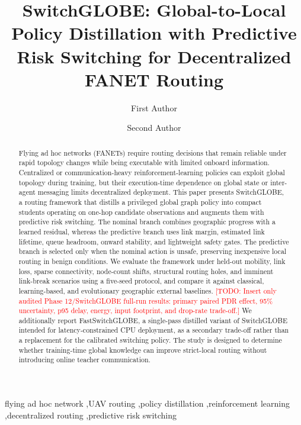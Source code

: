 \documentclass[preprint,12pt]{elsarticle}
\newcommand{\method}{SwitchGLOBE}
\newcommand{\fastmethod}{FastSwitchGLOBE}
\newcommand{\todo}[1]{\textcolor{red}{[TODO: #1]}}
\begin{document}
\begin{frontmatter}

\title{SwitchGLOBE: Global-to-Local Policy Distillation with Predictive Risk Switching for Decentralized FANET Routing}

\author[aff1]{First Author}
\author[aff1]{Second Author}
\address[aff1]{Department, Institution, City, Postal Code, Republic of Korea}

\begin{abstract}
Flying ad hoc networks (FANETs) require routing decisions that remain reliable under rapid topology changes while being executable with limited onboard information. Centralized or communication-heavy reinforcement-learning policies can exploit global topology during training, but their execution-time dependence on global state or inter-agent messaging limits decentralized deployment. This paper presents \method, a routing framework that distills a privileged global graph policy into compact students operating on one-hop candidate observations and augments them with predictive risk switching. The nominal branch combines geographic progress with a learned residual, whereas the predictive branch uses link margin, estimated link lifetime, queue headroom, onward stability, and lightweight safety gates. The predictive branch is selected only when the nominal action is unsafe, preserving inexpensive local routing in benign conditions. We evaluate the framework under held-out mobility, link loss, sparse connectivity, node-count shifts, structural routing holes, and imminent link-break scenarios using a five-seed protocol, and compare it against classical, learning-based, and evolutionary geographic external baselines. \todo{Insert only audited Phase 12/SwitchGLOBE full-run results: primary paired PDR effect, 95\% uncertainty, p95 delay, energy, input footprint, and drop-rate trade-off.} We additionally report \fastmethod{}, a single-pass distilled variant of \method{} intended for latency-constrained CPU deployment, as a secondary trade-off rather than a replacement for the calibrated switching policy. The study is designed to determine whether training-time global knowledge can improve strict-local routing without introducing online teacher communication.
\end{abstract}

\begin{keyword}
flying ad hoc network \sep UAV routing \sep policy distillation \sep reinforcement learning \sep decentralized routing \sep predictive risk switching
\end{keyword}

\end{frontmatter}
\end{document}
